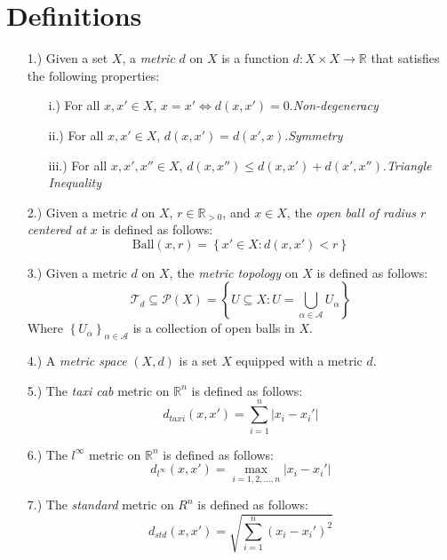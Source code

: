 \documentclass[12pt]{article}
\newcommand{\vertb}[1]{\left\vert#1\right\vert}      %
\newcommand{\braces}[1]{\left\{#1\right\}}           %
\newcommand{\R}{\mathbb{R}}
\begin{document}
\pagestyle{fancy}
\fancyhead{}

\normalsize

\section*{Definitions}
\begin{itemize}
    \item [1.)] Given a set $X$, a \textit{metric} $d$ on $X$ is a function $d:X\times X\to\R$ that satisfies the following properties:
    \begin{itemize}
        \item [i.)] For all $x,x'\in X$, $x=x'\iff d(x,x')=0$.\hfill\textit{Non-degeneracy}

        \item [ii.)] For all $x,x'\in X$, $d(x,x')=d(x',x)$.\hfill\textit{Symmetry}

        \item [iii.)] For all $x,x',x''\in X$, $d(x,x'')\leq d(x,x')+d(x',x'')$.\hfill\textit{Triangle Inequality}
    \end{itemize}

    \item [2.)] Given a metric $d$ on $X$, $r\in\R_{>0}$, and $x\in X$, the \textit{open ball of radius $r$ centered at $x$} is defined as follows:
    \[\text{Ball}(x,r)=\braces{x'\in X:d(x,x')<r}\]

    \item [3.)] Given a metric $d$ on $X$, the \textit{metric topology} on $X$ is defined as follows:
    \[\mathcal{T}_d\subseteq\mathcal{P}(X)=\braces{U\subseteq X:U=\bigcup_{\alpha\in\mathcal{A}}U_\alpha}\]
    Where $\braces{U_\alpha}_{\alpha\in\mathcal{A}}$ is a collection of open balls in $X$.

    \item [4.)] A \textit{metric space} $(X,d)$ is a set $X$ equipped with a metric $d$.

    \item [5.)] The \textit{taxi cab} metric on $\R^n$ is defined as follows:
    \[d_{taxi}(x,x')=\sum_{i=1}^n\vertb{x_i-x_i'}\]

    \item [6.)] The $l^\infty$ metric on $\R^n$ is defined as follows:
    \[d_{l^\infty}(x,x')=\max_{i=1,2,\dots,n}\vertb{x_i-x_i'}\]

    \item [7.)] The \textit{standard} metric on $R^n$ is defined as follows:
    \[d_{std}(x,x')=\sqrt{\sum_{i=1}^n(x_i-x_i')^2}\]


\end{itemize}
\end{document}
